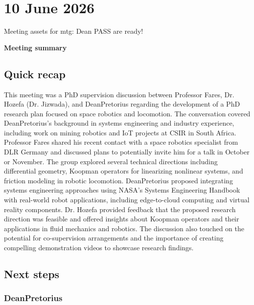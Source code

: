 \section{10 June 2026}

Meeting assets for mtg: Dean PASS are ready! 

\textbf{Meeting summary }

\subsection{Quick recap}

This meeting was a PhD supervision discussion between Professor Fares, Dr. Hozefa (Dr. Jizwada), and DeanPretorius regarding the development of a PhD research plan focused on space robotics and locomotion. The conversation covered DeanPretorius's background in systems engineering and industry experience, including work on mining robotics and IoT projects at CSIR in South Africa. Professor Fares shared his recent contact with a space robotics specialist from DLR Germany and discussed plans to potentially invite him for a talk in October or November. The group explored several technical directions including differential geometry, Koopman operators for linearizing nonlinear systems, and friction modeling in robotic locomotion. DeanPretorius proposed integrating systems engineering approaches using NASA's Systems Engineering Handbook with real-world robot applications, including edge-to-cloud computing and virtual reality components. Dr. Hozefa provided feedback that the proposed research direction was feasible and offered insights about Koopman operators and their applications in fluid mechanics and robotics. The discussion also touched on the potential for co-supervision arrangements and the importance of creating compelling demonstration videos to showcase research findings.

\subsection{Next steps}

\subsubsection{DeanPretorius}

